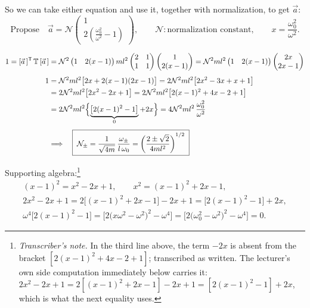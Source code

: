 \documentclass[11pt]{article}
\newcommand{\Tm}{\mathbb{T}}
\newcommand{\tnote}[1]{\footnote{\emph{Transcriber's note.} #1}}
\begin{document}
So we can take either equation and use it, together with normalization, to get
$\vec a$:
\begin{equation*}
  \text{Propose}\quad
  \vec a = \mathcal{N}
    \begin{pmatrix}1\\[2pt] 2\!\left(\frac{\omega_0^2}{\omega^2}-1\right)\end{pmatrix},
  \qquad \mathcal{N}: \text{normalization constant},
  \qquad x = \frac{\omega_0^2}{\omega^2}.
\end{equation*}

\begin{align*}
  1 = [\vec a\,]^{\mathsf T}\,\Tm\,[\vec a\,]
   &= \mathcal{N}^2\begin{pmatrix}1 & 2(x-1)\end{pmatrix} ml^2
      \begin{pmatrix}2 & 1\\ 1 & 1\end{pmatrix}
      \begin{pmatrix}1\\ 2(x-1)\end{pmatrix}
    = \mathcal{N}^2 ml^2 \begin{pmatrix}1 & 2(x-1)\end{pmatrix}
      \begin{pmatrix}2x\\ 2x-1\end{pmatrix}\\[4pt]
  1 &= \mathcal{N}^2 ml^2\bigl[2x + 2(x-1)(2x-1)\bigr]
     = 2\mathcal{N}^2 ml^2\bigl[2x^2 - 3x + x + 1\bigr]\\
   &= 2\mathcal{N}^2 ml^2\bigl[2x^2 - 2x + 1\bigr]
     = 2\mathcal{N}^2 ml^2\bigl[2(x-1)^2 + 4x - 2 + 1\bigr]\\
   &= 2\mathcal{N}^2 ml^2\Bigl\{\underbrace{\bigl[2(x-1)^2 - 1\bigr]}_{0} + 2x\Bigr\}
     = 4\mathcal{N}^2 ml^2\,\frac{\omega_0^2}{\omega^2}\\[4pt]
  &\Longrightarrow\quad
  \boxeq{\;\mathcal{N}_\pm = \frac{1}{\sqrt{4m}}\,\frac{\omega_\pm}{l\,\omega_0}
    = \left(\frac{2\pm\sqrt2}{4ml^2}\right)^{1/2}\;}
\end{align*}

\noindent Supporting algebra:\tnote{In the third line above, the term $-2x$ is
absent from the bracket $[2(x-1)^2 + 4x - 2 + 1]$; transcribed as written. The
lecturer's own side computation immediately below carries it:
$2x^2-2x+1 = 2[(x-1)^2+2x-1] - 2x + 1 = [2(x-1)^2-1]+2x$, which is what the next
equality uses.}
\begin{gather*}
  (x-1)^2 = x^2 - 2x + 1 ,
  \qquad x^2 = (x-1)^2 + 2x - 1 ,\\
  2x^2 - 2x + 1 = 2\bigl[(x-1)^2 + 2x - 1\bigr] - 2x + 1 = \bigl[2(x-1)^2 - 1\bigr] + 2x ,\\[4pt]
  \omega^4\bigl[2(x-1)^2 - 1\bigr]
    = \bigl[2\bigl(x\omega^2 - \omega^2\bigr)^2 - \omega^4\bigr]
    = \bigl[2\bigl(\omega_0^2 - \omega^2\bigr)^2 - \omega^4\bigr] = 0 .
\end{gather*}
\end{document}
